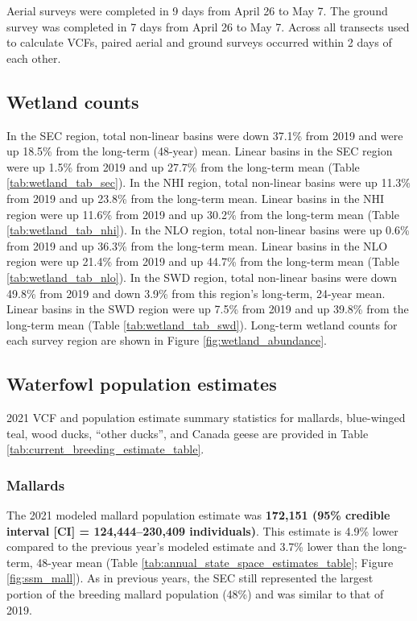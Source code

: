 \documentclass[
  12pt,
]{article}
\begin{document}
Aerial surveys were completed in 9 days from April 26 to May 7. The
ground survey was completed in 7 days from April 26 to May 7. Across all
transects used to calculate VCFs, paired aerial and ground surveys
occurred within 2 days of each other.

\hypertarget{wetland-counts}{%
\subsection{Wetland counts}\label{wetland-counts}}

In the SEC region, total non-linear basins were down 37.1\% from 2019
and were up 18.5\% from the long-term (48-year) mean. Linear basins in
the SEC region were up 1.5\% from 2019 and up 27.7\% from the long-term
mean (Table \ref{tab:wetland_tab_sec}). In the NHI region, total
non-linear basins were up 11.3\% from 2019 and up 23.8\% from the
long-term mean. Linear basins in the NHI region were up 11.6\% from 2019
and up 30.2\% from the long-term mean (Table \ref{tab:wetland_tab_nhi}).
In the NLO region, total non-linear basins were up 0.6\% from 2019 and
up 36.3\% from the long-term mean. Linear basins in the NLO region were
up 21.4\% from 2019 and up 44.7\% from the long-term mean (Table
\ref{tab:wetland_tab_nlo}). In the SWD region, total non-linear basins
were down 49.8\% from 2019 and down 3.9\% from this region's long-term,
24-year mean. Linear basins in the SWD region were up 7.5\% from 2019
and up 39.8\% from the long-term mean (Table \ref{tab:wetland_tab_swd}).
Long-term wetland counts for each survey region are shown in Figure
\ref{fig:wetland_abundance}.

\hypertarget{waterfowl-population-estimates}{%
\subsection{Waterfowl population
estimates}\label{waterfowl-population-estimates}}

2021 VCF and population estimate summary statistics for mallards,
blue-winged teal, wood ducks, ``other ducks'', and Canada geese are
provided in Table \ref{tab:current_breeding_estimate_table}.

\hypertarget{mallards}{%
\subsubsection{Mallards}\label{mallards}}

The 2021 modeled mallard population estimate was \textbf{172,151 (95\%
credible interval {[}CI{]} = 124,444--230,409 individuals)}. This
estimate is 4.9\% lower compared to the previous year's modeled estimate
and 3.7\% lower than the long-term, 48-year mean (Table
\ref{tab:annual_state_space_estimates_table}; Figure
\ref{fig:ssm_mall}). As in previous years, the SEC still represented the
largest portion of the breeding mallard population (48\%) and was
similar to that of 2019.
\end{document}
